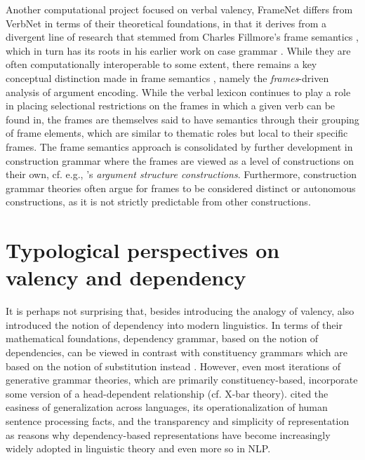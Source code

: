 Another computational project focused on verbal valency, FrameNet \citep{baker1998, fillmore2015} differs from VerbNet in terms of their theoretical foundations, in that it derives from a divergent line of research that stemmed from Charles Fillmore's frame semantics \citep{fillmore1977, fillmore1977a, fillmore1982}, which in turn has its roots in his earlier work on case grammar \citep{fillmore1968,fillmore1970}. While they are often computationally interoperable to some extent, there remains a key conceptual distinction made in frame semantics \citet{fillmore1968}, namely the \textit{frames}-driven analysis of argument encoding. While the verbal lexicon continues to play a role in placing selectional restrictions on the frames in which a given verb can be found in, the frames are themselves said to have semantics through their grouping of frame elements, which are similar to thematic roles but local to their specific frames. The frame semantics approach is consolidated by further development in construction grammar where the frames are viewed as a level of constructions on their own, cf. e.g., \citet{goldberg1992,goldberg1995}'s \textit{argument structure constructions}. Furthermore, construction grammar theories often argue for frames to be considered distinct or autonomous constructions, as it is not strictly predictable from other constructions.

\section{Typological perspectives on valency and dependency}

It is perhaps not surprising that, besides introducing the analogy of valency, \citet{tesniere1959} also introduced the notion of dependency into modern linguistics. In terms of their mathematical foundations, dependency grammar, based on the notion of dependencies, can be viewed in contrast with constituency grammars which are based on the notion of substitution instead \citep{stabler2019}. However, even most iterations of generative grammar theories, which are primarily constituency-based, incorporate some version of a head-dependent relationship (cf. X-bar theory). \citet{demarneffe2019} cited the easiness of generalization across languages, its operationalization of human sentence processing facts, and the transparency and simplicity of representation as reasons why dependency-based representations have become increasingly widely adopted in linguistic theory and even more so in NLP.

